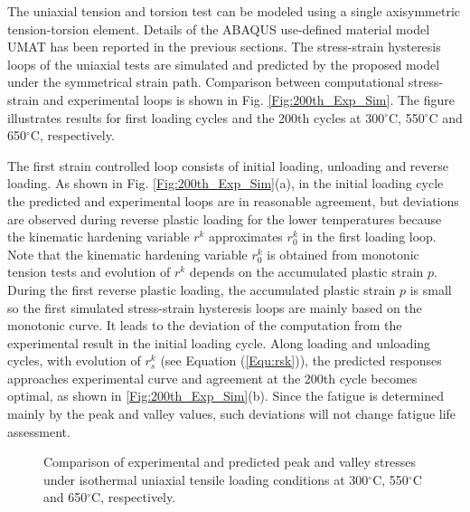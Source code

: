 \documentclass[preprint,5p,twocolumn,11pt,sort&compress]{elsarticle}
\begin{document}
\begin{figure*}
\caption{Comparison of the stress-strain hysteresis loops between experiments and computations  under isothermal uniaxial tensile loading conditions at 300$^{\circ}$C, 550$^{\circ}$C and 650$^{\circ}$C, respectively. (a) The first loading cycle. (b) The 200th cycle.}
\label{Fig:200th_Exp_Sim}
\end{figure*}

The uniaxial tension and torsion test can be modeled using a single axisymmetric tension-torsion element.
Details of the ABAQUS use-defined material model UMAT has been reported in the previous sections.
The stress-strain hysteresis loops of the uniaxial tests are simulated and predicted by the proposed model under the symmetrical strain path.
Comparison between  computational stress-strain and  experimental loops is shown in Fig. \ref{Fig:200th_Exp_Sim}.
The figure illustrates results for first loading cycles and the 200th cycles at 300$^{\circ}$C, 550$^{\circ}$C and 650$^{\circ}$C, respectively.

The first strain controlled loop consists of initial loading, unloading and reverse loading.
As shown in Fig. \ref{Fig:200th_Exp_Sim}(a), in the initial loading cycle the predicted and experimental loops are in reasonable agreement, but deviations are observed during reverse plastic loading for the lower temperatures because the kinematic hardening variable $r^k$ approximates ${r_0^k}$ in the first loading loop.
Note that the kinematic hardening variable ${r_0^k}$ is obtained from monotonic tension tests and evolution of $r^k$ depends on the accumulated plastic strain $p$.
During the first reverse plastic loading, the accumulated plastic strain $p$ is small so the first simulated stress-strain hysteresis loops are mainly based on the monotonic curve. It leads to the deviation of the computation from the experimental result in the initial loading cycle.
Along loading and unloading cycles, with evolution of $r_s^k$ (see Equation (\ref{Equ:rsk})), the predicted responses approaches experimental curve and agreement at the 200th cycle becomes optimal, as shown in \ref{Fig:200th_Exp_Sim}(b). Since the fatigue is determined mainly by the peak and valley values, such deviations will not change fatigue life assessment.


\begin{figure}
\caption{Comparison of experimental and predicted peak and valley stresses under isothermal uniaxial tensile loading conditions at 300$^{\circ}$C, 550$^{\circ}$C and 650$^{\circ}$C, respectively.}
\label{Fig:Compare_PACC-PV_stress_temperature}
\end{figure}
\end{document}
